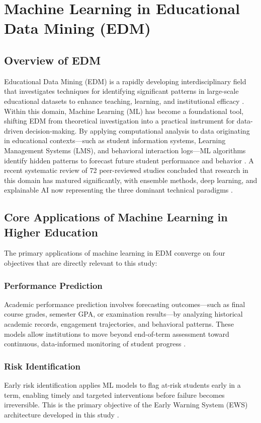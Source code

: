 \documentclass[12pt]{report}
\begin{document}
\section{Machine Learning in Educational Data Mining (EDM)}

\subsection{Overview of EDM}

Educational Data Mining (EDM) is a rapidly developing interdisciplinary
field that investigates techniques for identifying significant patterns in
large-scale educational datasets to enhance teaching, learning, and
institutional efficacy \parencite{bello2025}. Within this domain, Machine
Learning (ML) has become a foundational tool, shifting EDM from theoretical
investigation into a practical instrument for data-driven decision-making.
By applying computational analysis to data originating in educational
contexts---such as student information systems, Learning Management Systems
(LMS), and behavioral interaction logs---ML algorithms identify hidden
patterns to forecast future student performance and behavior
\parencite{Dirin2022}. A recent systematic review of 72 peer-reviewed
studies concluded that research in this domain has matured significantly,
with ensemble methods, deep learning, and explainable AI now representing
the three dominant technical paradigms \parencite{aldowah2026}.

\subsection{Core Applications of Machine Learning in Higher Education}

The primary applications of machine learning in EDM converge on four
objectives that are directly relevant to this study:

\subsubsection{Performance Prediction}
Academic performance prediction involves forecasting outcomes---such as
final course grades, semester GPA, or examination results---by analyzing
historical academic records, engagement trajectories, and behavioral
patterns. These models allow institutions to move beyond end-of-term
assessment toward continuous, data-informed monitoring of student progress
\parencite{kwakye2025}.

\subsubsection{Risk Identification}
Early risk identification applies ML models to flag at-risk students early
in a term, enabling timely and targeted interventions before failure becomes
irreversible. This is the primary objective of the Early Warning System
(EWS) architecture developed in this study \parencite{bello2025}.
\end{document}

